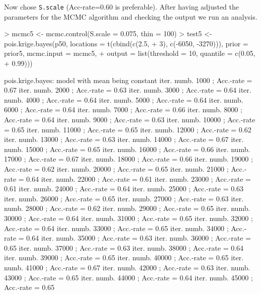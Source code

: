 \documentclass[12pt,a4paper]{article}
\newcommand{\code}[1]{\texttt{\small #1}}
\begin{document}
Now chose \code{S.scale} (Acc-rate=0.60 is preferable).  
After having adjusted the parameters for the MCMC algorithm and checking the output we run an analysis.
\begin{Schunk}
\begin{Sinput}
> mcmc5 <- mcmc.control(S.scale = 0.075, thin = 100)
> test5 <- pois.krige.bayes(p50, locations = t(cbind(c(2.5, 
+     3), c(-6050, -3270))), prior = prior5, mcmc.input = mcmc5, 
+     output = list(threshold = 10, quantile = c(0.05, 
+         0.99)))
\end{Sinput}
\end{Schunk}
\begin{Schunk}
\begin{Soutput}
pois.krige.bayes: model with mean being constant
iter. numb. 1000 ; Acc.-rate = 0.67 
iter. numb. 2000 ; Acc.-rate = 0.63 
iter. numb. 3000 ; Acc.-rate = 0.64 
iter. numb. 4000 ; Acc.-rate = 0.64 
iter. numb. 5000 ; Acc.-rate = 0.64 
iter. numb. 6000 ; Acc.-rate = 0.64 
iter. numb. 7000 ; Acc.-rate = 0.66 
iter. numb. 8000 ; Acc.-rate = 0.64 
iter. numb. 9000 ; Acc.-rate = 0.63 
iter. numb. 10000 ; Acc.-rate = 0.65 
iter. numb. 11000 ; Acc.-rate = 0.65 
iter. numb. 12000 ; Acc.-rate = 0.62 
iter. numb. 13000 ; Acc.-rate = 0.63 
iter. numb. 14000 ; Acc.-rate = 0.67 
iter. numb. 15000 ; Acc.-rate = 0.65 
iter. numb. 16000 ; Acc.-rate = 0.66 
iter. numb. 17000 ; Acc.-rate = 0.67 
iter. numb. 18000 ; Acc.-rate = 0.66 
iter. numb. 19000 ; Acc.-rate = 0.62 
iter. numb. 20000 ; Acc.-rate = 0.65 
iter. numb. 21000 ; Acc.-rate = 0.64 
iter. numb. 22000 ; Acc.-rate = 0.61 
iter. numb. 23000 ; Acc.-rate = 0.61 
iter. numb. 24000 ; Acc.-rate = 0.64 
iter. numb. 25000 ; Acc.-rate = 0.63 
iter. numb. 26000 ; Acc.-rate = 0.65 
iter. numb. 27000 ; Acc.-rate = 0.63 
iter. numb. 28000 ; Acc.-rate = 0.62 
iter. numb. 29000 ; Acc.-rate = 0.65 
iter. numb. 30000 ; Acc.-rate = 0.64 
iter. numb. 31000 ; Acc.-rate = 0.65 
iter. numb. 32000 ; Acc.-rate = 0.64 
iter. numb. 33000 ; Acc.-rate = 0.65 
iter. numb. 34000 ; Acc.-rate = 0.64 
iter. numb. 35000 ; Acc.-rate = 0.63 
iter. numb. 36000 ; Acc.-rate = 0.65 
iter. numb. 37000 ; Acc.-rate = 0.63 
iter. numb. 38000 ; Acc.-rate = 0.64 
iter. numb. 39000 ; Acc.-rate = 0.65 
iter. numb. 40000 ; Acc.-rate = 0.65 
iter. numb. 41000 ; Acc.-rate = 0.67 
iter. numb. 42000 ; Acc.-rate = 0.63 
iter. numb. 43000 ; Acc.-rate = 0.65 
iter. numb. 44000 ; Acc.-rate = 0.64 
iter. numb. 45000 ; Acc.-rate = 0.65 

\end{Soutput}
\end{Schunk}
\end{document}
